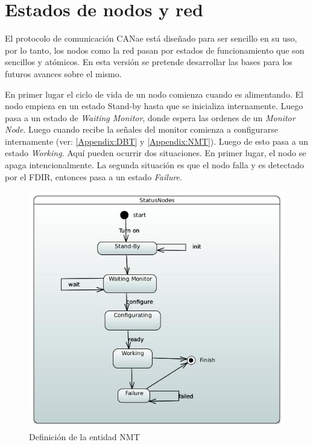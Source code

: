 \section{Estados de nodos y red}
El protocolo de comunicación CANae está diseñado para ser sencillo en su uso,
por lo tanto, los nodos como la red pasan por estados de funcionamiento
que son sencillos y atómicos. En esta versión se pretende desarrollar las bases
para los futuros avances sobre el mismo.

En primer lugar el ciclo de vida de un nodo comienza cuando es alimentando. El
nodo empieza en un estado Stand-by hasta que se inicializa internamente. Luego
pasa a un estado de \textit{Waiting Monitor}, donde espera las ordenes de un
\textit{Monitor Node}.  Luego cuando recibe la señales del monitor comienza a
configurarse internamente (ver: \ref{Appendix:DBT} y \ref{Appendix:NMT}).
Luego de esto pasa a un estado \textit{Working}. Aquí pueden ocurrir dos
situaciones. En primer lugar, el nodo se apaga intencionalmente. La segunda
situación es que el nodo falla y es detectado por el \ac{FDIR}, entonces pasa
a un estado \textit{Failure}.

\begin{figure}[h!]
 \centering
 \includegraphics[scale=0.4]{images/Secciones/AppendixA/StatusNode.JPG}
  \caption{Definición de la entidad NMT}
\label{fig:NodeStatus}
\end{figure}

